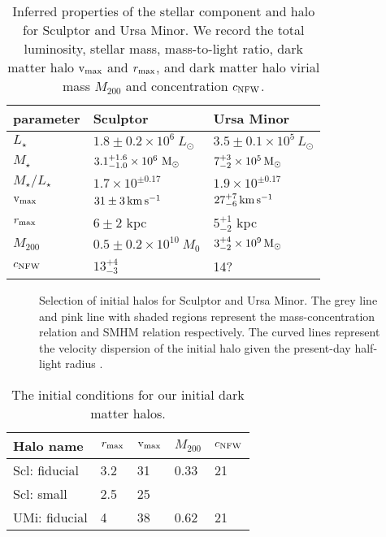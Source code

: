 \begin{table*}[t]
\centering
\caption[Derived Properties of Sculptor and Ursa Minor]{Inferred properties of the stellar component and halo for Sculptor and Ursa Minor. We record the total luminosity, stellar mass, mass-to-light ratio, dark matter halo ${\rm v}_{\rm max}$ and $r_{\rm max}$, and dark matter halo virial mass $M_{200}$ and concentration $c_{\rm NFW}$. }
\label{tbl:derived_props}
\begin{tabular}{lll}
\toprule
parameter & Sculptor & Ursa Minor\\
\midrule
$L_\star$ & $1.8\pm0.2\times10^6\ L_\odot$ & $3.5 \pm 0.1 \times 10^5\,L_\odot$\\
$M_\star$ & $3.1_{-1.0}^{+1.6} \times10^6\ {\rm M}_\odot$ & $7_{-2}^{+3} \times 10^5\,{\rm M}_{\odot}$\\
$M_\star / L_\star$ & $1.7\times 10^{\pm 0.17}$ & $1.9 \times 10^{\pm 0.17}$\\
${\rm v}_{\rm max}$ & $31\pm 3\,{\rm km\,s^{-1}}$ & $27_{-6}^{+7}\,{\rm km\,s^{-1}}$\\
$r_{\rm max}$ & $6 \pm 2$ kpc & $5_{-2}^{+1}$ kpc\\
$M_{200}$ & $0.5 \pm 0.2\times10^{10}\ M_0$ & $3_{-2}^{+4} \times 10^9\,{\rm M}_{\odot}$\\
$c_{\rm NFW}$ & $13_{-3}^{+4}$ & 14?\\
\bottomrule
\end{tabular}
\end{table*}

\begin{figure}
\centering
{}
\caption[Sculptor initial halos]{Selection of initial halos for Sculptor
and Ursa Minor. The grey line and pink line with shaded regions
represent the \citet{ludlow+2016} mass-concentration relation and
\citet{fattahi+2018} SMHM relation respectively. The curved lines
represent the velocity dispersion of the initial halo given the
present-day half-light radius \citep[via the][ mass
estimator]{wolf+2010}.}\label{fig:scl_halos}
\end{figure}

\begin{table*}[t]
\centering
\caption[Initial halos]{The initial conditions for our initial dark matter halos. }
\label{tbl:initial_halos}
\begin{tabular}{lllll}
\toprule
Halo name & $r_{\rm max}$ & ${\rm v}_{\rm max}$ & $M_{200}$ & $c_{\rm NFW}$\\
\midrule
Scl: fiducial & 3.2 & 31 & 0.33 & 21\\
Scl: small & 2.5 & 25 &  & \\
UMi: fiducial & 4 & 38 & 0.62 & 21\\
\bottomrule
\end{tabular}
\end{table*}

